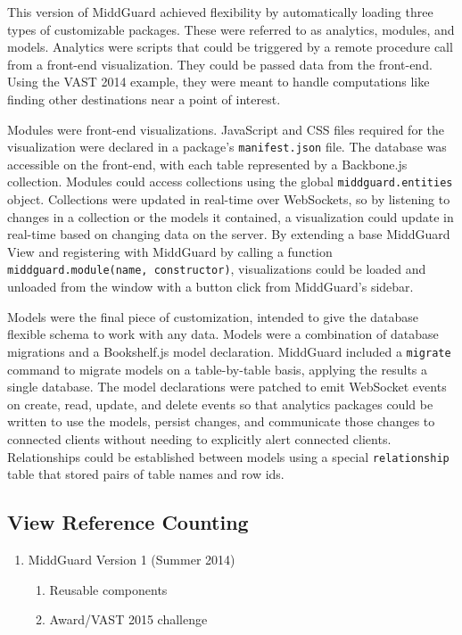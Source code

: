 \documentclass[midd]{thesis}
\begin{document}
This version of MiddGuard achieved flexibility by automatically loading three
types of customizable packages. These were referred to as analytics, modules,
and models. Analytics were scripts that could be triggered by a remote procedure
call from a front-end visualization. They could be passed data from the
front-end. Using the VAST 2014 example, they were meant to handle computations
like finding other destinations near a point of interest.

Modules were front-end visualizations. JavaScript and CSS files required for the
visualization were declared in a package's \texttt{manifest.json} file. The
database was accessible on the front-end, with each table represented by a
Backbone.js collection. Modules could access collections using the global
\texttt{middguard.entities} object. Collections were updated in real-time over
WebSockets, so by listening to changes in a collection or the models it
contained, a visualization could update in real-time based on changing data on
the server. By extending a base MiddGuard View \cite{backbone} and registering
with MiddGuard by calling a function \texttt{middguard.module(name,
constructor)}, visualizations could be loaded and unloaded from the window with
a button click from MiddGuard's sidebar.

Models were the final piece of customization, intended to give the database
flexible schema to work with any data. Models were a combination of database
migrations and a Bookshelf.js \cite{bookshelf} model declaration. MiddGuard
included a \texttt{migrate} command to migrate models on a table-by-table basis,
applying the results a single database. The model declarations were patched to
emit WebSocket events on create, read, update, and delete events so that
analytics packages could be written to use the models, persist changes, and
communicate those changes to connected clients without needing to explicitly
alert connected clients. Relationships could be established between models using
a special \texttt{relationship} table that stored pairs of table names and row
ids.

\subsection{View Reference Counting}

\begin{enumerate}
  \item MiddGuard Version 1 (Summer 2014)
  \begin{enumerate}
    \item Reusable components
    \item Award/VAST 2015 challenge
  \end{enumerate}
\end{enumerate}
\end{document}
